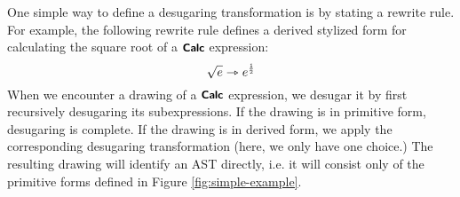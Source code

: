 One simple way to define a desugaring transformation is by stating a rewrite rule. For example, the following rewrite rule defines a derived stylized form for calculating the square root of a $\textsf{\textbf{\small Calc}}$ expression:
\begin{equation}\label{rule:simplelang-sqrt}
\sqrt{e} \rightarrowtriangle e^{\frac{\numintro{1}}{\numintro{2}}}
\end{equation}
When we encounter a drawing of a $\textsf{\textbf{\small Calc}}$ expression, we desugar  it by first recursively desugaring its subexpressions. If the drawing is in primitive form, desugaring is complete.  If the drawing is in derived form, we apply the corresponding desugaring transformation (here, we only have one choice.) The resulting drawing will identify an AST directly, i.e. it will consist only of the primitive forms defined in Figure \ref{fig:simple-example}.

